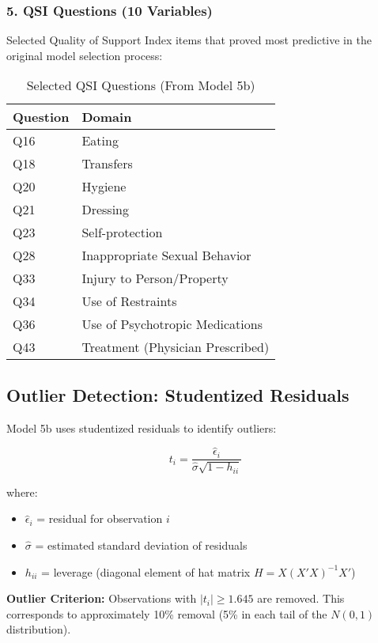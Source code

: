 \subsubsection{5. QSI Questions (10 Variables)}

Selected Quality of Support Index items that proved most predictive in the original model selection process:

\begin{table}[h]
\centering
\caption{Selected QSI Questions (From Model 5b)}
\begin{tabular}{ll}
\toprule
\textbf{Question} & \textbf{Domain} \\
\midrule
Q16 & Eating \\
Q18 & Transfers \\
Q20 & Hygiene \\
Q21 & Dressing \\
Q23 & Self-protection \\
Q28 & Inappropriate Sexual Behavior \\
Q33 & Injury to Person/Property \\
Q34 & Use of Restraints \\
Q36 & Use of Psychotropic Medications \\
Q43 & Treatment (Physician Prescribed) \\
\bottomrule
\end{tabular}
\end{table}

\subsection{Outlier Detection: Studentized Residuals}

Model 5b uses studentized residuals to identify outliers:

\begin{equation}
t_i = \frac{\hat{\epsilon}_i}{\hat{\sigma}\sqrt{1 - h_{ii}}}
\end{equation}

where:
\begin{itemize}
    \item $\hat{\epsilon}_i$ = residual for observation $i$
    \item $\hat{\sigma}$ = estimated standard deviation of residuals
    \item $h_{ii}$ = leverage (diagonal element of hat matrix $H = X(X'X)^{-1}X'$)
\end{itemize}

\textbf{Outlier Criterion:} Observations with $|t_i| \geq 1.645$ are removed. This corresponds to approximately 10\% removal (5\% in each tail of the $N(0,1)$ distribution).

